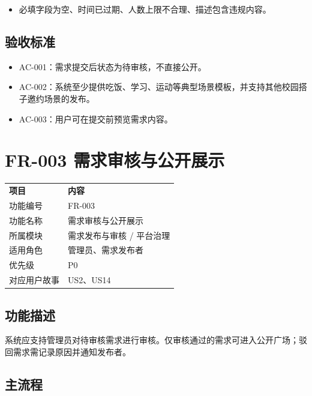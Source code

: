 \begin{itemize}
\item
  必填字段为空、时间已过期、人数上限不合理、描述包含违规内容。
\end{itemize}

\subsection{验收标准}\label{ux9a8cux6536ux6807ux51c6-1}

\begin{itemize}
\item
  AC-001：需求提交后状态为待审核，不直接公开。
\item
  AC-002：系统至少提供吃饭、学习、运动等典型场景模板，并支持其他校园搭子邀约场景的发布。
\item
  AC-003：用户可在提交前预览需求内容。
\end{itemize}

\section{FR-003
需求审核与公开展示}\label{fr-003-ux9700ux6c42ux5ba1ux6838ux4e0eux516cux5f00ux5c55ux793a}

{\def\LTcaptype{none} %
\begin{xltabular}{\textwidth}{@{}>{\centering\arraybackslash}X>{\centering\arraybackslash}X@{}}
\toprule\noalign{}
\endhead
\bottomrule\noalign{}
\endlastfoot
\textbf{项目} & \textbf{内容} \\
功能编号 & FR-003 \\
功能名称 & 需求审核与公开展示 \\
所属模块 & 需求发布与审核 / 平台治理 \\
适用角色 & 管理员、需求发布者 \\
优先级 & P0 \\
对应用户故事 & US2、US14 \\
\end{xltabular}
}

\subsection{功能描述}\label{ux529fux80fdux63cfux8ff0-2}

系统应支持管理员对待审核需求进行审核。仅审核通过的需求可进入公开广场；驳回需求需记录原因并通知发布者。

\subsection{主流程}\label{ux4e3bux6d41ux7a0b-2}

